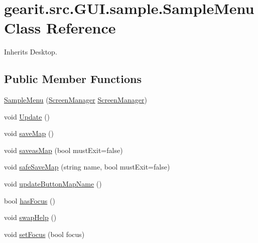 \hypertarget{classgearit_1_1src_1_1_g_u_i_1_1sample_1_1_sample_menu}{\section{gearit.\+src.\+G\+U\+I.\+sample.\+Sample\+Menu Class Reference}
\label{classgearit_1_1src_1_1_g_u_i_1_1sample_1_1_sample_menu}
}


Inherits Desktop.

\subsection*{Public Member Functions}
\begin{DoxyCompactItemize}
\item 
\hyperlink{classgearit_1_1src_1_1_g_u_i_1_1sample_1_1_sample_menu_a901554aa16e080d29dc332691ffffde8}{Sample\+Menu} (\hyperlink{classgearit_1_1xna_1_1_screen_manager}{Screen\+Manager} \hyperlink{classgearit_1_1xna_1_1_screen_manager}{Screen\+Manager})
\item 
void \hyperlink{classgearit_1_1src_1_1_g_u_i_1_1sample_1_1_sample_menu_a552e97122e092e513dcff7c7aeb80e79}{Update} ()
\item 
void \hyperlink{classgearit_1_1src_1_1_g_u_i_1_1sample_1_1_sample_menu_aa3b18ddec16bb3be82a4a2196d0fbfcd}{save\+Map} ()
\item 
void \hyperlink{classgearit_1_1src_1_1_g_u_i_1_1sample_1_1_sample_menu_a05263a3cd3855a46362338b38d8bef5c}{saveas\+Map} (bool must\+Exit=false)
\item 
void \hyperlink{classgearit_1_1src_1_1_g_u_i_1_1sample_1_1_sample_menu_a7239580f33597d4e578a210b07d53ce8}{safe\+Save\+Map} (string name, bool must\+Exit=false)
\item 
void \hyperlink{classgearit_1_1src_1_1_g_u_i_1_1sample_1_1_sample_menu_a991d5fa72ca1616bc79ac190e67ead84}{update\+Button\+Map\+Name} ()
\item 
bool \hyperlink{classgearit_1_1src_1_1_g_u_i_1_1sample_1_1_sample_menu_aba973fdcae4a3198fed3179500277d5b}{has\+Focus} ()
\item 
void \hyperlink{classgearit_1_1src_1_1_g_u_i_1_1sample_1_1_sample_menu_ae2acad47fe3c4249f5bcea957c2ce64d}{swap\+Help} ()
\item 
void \hyperlink{classgearit_1_1src_1_1_g_u_i_1_1sample_1_1_sample_menu_a94715de5e1bb1136890fcb4e47eff243}{set\+Focus} (bool focus)
\end{DoxyCompactItemize}
